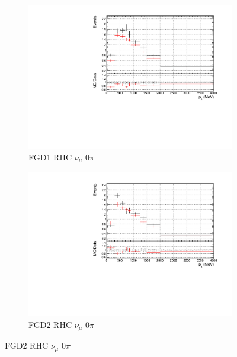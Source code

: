 \begin{figure}[!h]
\begin{subfigure}{0.49\textwidth}
  \centering
  \includegraphics[width=\textwidth]{figs/prioronly1D_p_FGD1_NuMuBkg_CC0pi_in_AntiNu_Mode}
  \caption{FGD1 RHC $\nu_{\mu}$ 0$\pi$}
\end{subfigure}
\begin{subfigure}{0.49\textwidth}
  \centering
  \includegraphics[width=\textwidth]{figs/prioronly1D_p_FGD2_NuMuBkg_CC0pi_in_AntiNu_Mode}
  \caption{FGD2 RHC $\nu_{\mu}$ 0$\pi$}
\end{subfigure}


\end{figure}
